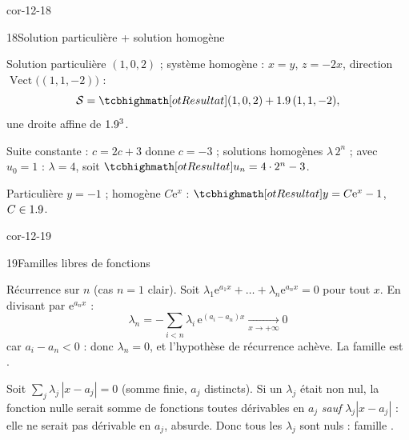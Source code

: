 \begin{blocLivre}{cor-12-18}
\begin{corrige}{18}{Solution particulière + solution homogène}
\begin{questions}
  \item Solution particulière $(1,0,2)$ ; système homogène : $x=y$,
    $z=-2x$, direction $\operatorname{Vect}\bigl((1,1,-2)\bigr)$ :
    \[
    \mathcal{S}=\res{(1,0,2)+\R\,(1,1,-2)},
    \]
    une droite affine de $1.9^{3}$.
  \item Suite constante : $c=2c+3$ donne $c=-3$ ; solutions homogènes
    $\lambda\,2^{n}$ ; avec $u_0=1$ : $\lambda=4$, soit
    $\res{u_n=4\cdot2^{n}-3}$.
  \item Particulière $y=-1$ ; homogène $C\mathrm{e}^{x}$ :
    $\res{y=C\mathrm{e}^{x}-1}$, $C\in1.9$.
\end{questions}
\end{corrige}
\end{blocLivre}

\begin{blocLivre}{cor-12-19}
\begin{corrige}{19}{Familles libres de fonctions}
\begin{questions}
  \item Récurrence sur $n$ (cas $n=1$ clair). Soit
    $\lambda_1\mathrm{e}^{a_1x}+\dots+\lambda_n\mathrm{e}^{a_nx}=0$ pour
    tout $x$. En divisant par $\mathrm{e}^{a_nx}$ :
    \[
    \lambda_n=-\sum_{i<n}\lambda_i\,\mathrm{e}^{(a_i-a_n)x}
    \xrightarrow[x\to+\infty]{}0
    \]
    car $a_i-a_n<0$ : donc $\lambda_n=0$, et l'hypothèse de récurrence
    achève. La famille est .
  \item Soit $\sum_{j}\lambda_j\,|x-a_j|=0$ (somme finie, $a_j$ distincts).
    Si un $\lambda_j$ était non nul, la fonction nulle serait somme de
    fonctions toutes dérivables en $a_j$ \emph{sauf}
    $\lambda_j|x-a_j|$ : elle ne serait pas dérivable en $a_j$, absurde.
    Donc tous les $\lambda_j$ sont nuls : famille .
\end{questions}
\end{corrige}
\end{blocLivre}

